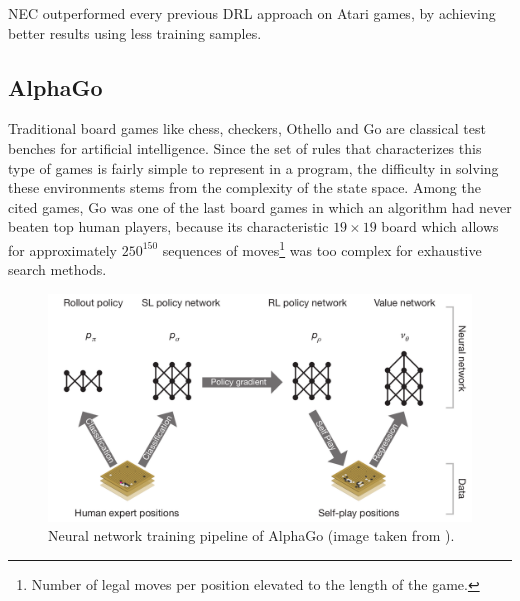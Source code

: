 NEC outperformed every previous DRL approach on Atari games, by achieving better
results using less training samples.

\subsection{AlphaGo} \label{s:alphago}
Traditional board games like chess, checkers, Othello and Go are classical 
test benches for artificial intelligence. Since the set of rules that
characterizes this type of games is fairly simple to represent in a program, the
difficulty in solving these environments stems from the complexity of the 
state space. Among the cited games, Go was one of the last board games in which 
an algorithm had never beaten top human players, because its characteristic 
$19 \times 19$ board which allows for approximately $250^{150}$ sequences of
moves\footnote{Number of legal moves per position elevated to the length of the 
game.} was too complex for exhaustive search methods.
%
\begin{figure}
\includegraphics[width=\textwidth]{pictures/alphago}
\centering
\caption[Neural network training pipeline of AlphaGo]{Neural network training 
						      pipeline of AlphaGo
						      (image taken from 
						      \cite{silver2016mastering}).}
\label{f:alphago}
\end{figure}
%

